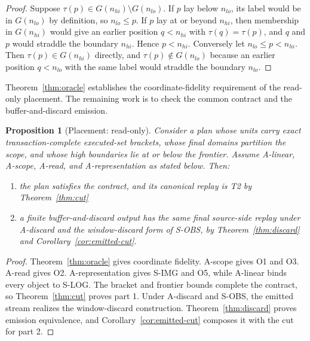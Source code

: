 \documentclass[sigconf,nonacm,10pt]{acmart}
\theoremstyle{plain}
\newtheorem{proposition}{Proposition}
\theoremstyle{definition}
\begin{document}
\begin{proof}
Suppose $\tau(p) \in G(n_{hi}) \setminus G(n_{lo})$. If $p$ lay
below $n_{lo}$, its label would be in $G(n_{lo})$ by definition,
so $n_{lo} \le p$. If $p$ lay at or beyond $n_{hi}$, then
membership in $G(n_{hi})$ would give an earlier position $q <
n_{hi}$ with $\tau(q) = \tau(p)$, and $q$ and $p$ would straddle
the boundary $n_{hi}$. Hence $p < n_{hi}$. Conversely let
$n_{lo} \le p < n_{hi}$. Then $\tau(p) \in G(n_{hi})$ directly,
and $\tau(p) \notin G(n_{lo})$ because an earlier position $q < n_{lo}$
with the same label would straddle the boundary $n_{lo}$.
\end{proof}

Theorem~\ref{thm:oracle} establishes the coordinate-fidelity requirement 
of the read-only placement. The remaining work is to check the common
contract and the buffer-and-discard emission.

\begin{proposition}[Placement: read-only]\label{prop:readonly}
Consider a plan whose units carry exact transaction-complete
executed-set brackets, whose final domains partition the scope, and
whose high boundaries lie at or below the frontier. Assume A-linear,
A-scope, A-read, and A-representation as stated below. Then:
\begin{enumerate}
\item the plan satisfies the contract, and its canonical replay is T2
by Theorem~\ref{thm:cut}
\item a finite buffer-and-discard output has the same final
source-side replay under A-discard and the window-discard form of
S-OBS, by Theorem~\ref{thm:discard} and
Corollary~\ref{cor:emitted-cut}.
\end{enumerate}
\end{proposition}

\begin{proof}
Theorem~\ref{thm:oracle} gives coordinate fidelity. A-scope gives O1
and O3. A-read gives O2. A-representation gives S-IMG and O5, while
A-linear binds every object to S-LOG. The bracket and frontier bounds
complete the contract, so Theorem~\ref{thm:cut} proves part 1. Under
A-discard and S-OBS, the emitted stream realizes the window-discard
construction. Theorem~\ref{thm:discard} proves emission equivalence,
and Corollary~\ref{cor:emitted-cut} composes it with the cut for part
2.
\end{proof}
\end{document}
